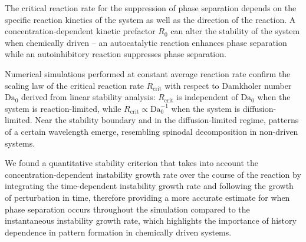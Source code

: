 \documentclass[reprint,aps,pre,superscriptaddress]{revtex4-2}
\begin{document}
The critical reaction rate for the suppression of phase separation depends on the specific reaction kinetics of the system as well as the direction of the reaction. A concentration-dependent kinetic prefactor $R_0$ can alter the stability of the system when chemically driven -- an autocatalytic reaction enhances phase separation while an autoinhibitory reaction suppresses phase separation.


Numerical simulations performed at constant average reaction rate confirm the scaling law of the critical reaction rate $R_\text{crit}$ with respect to Damkholer number $\text{Da}_0$ derived from linear stability analysis: $R_\text{crit}$ is independent of $\text{Da}_0$ when the system is reaction-limited, while $R_\text{crit} \propto \text{Da}_0^{-1}$ when the system is diffusion-limited. Near the stability boundary and in the diffusion-limited regime, patterns of a certain wavelength emerge, resembling spinodal decomposition in non-driven systems.

We found a quantitative stability criterion that takes into account the concentration-dependent instability growth rate over the course of the reaction by integrating the time-dependent instability growth rate and following the growth of perturbation in time, therefore providing a more accurate estimate for when phase separation occurs throughout the simulation compared to the instantaneous instability growth rate, which highlights the importance of history dependence in pattern formation in chemically driven systems.
\end{document}
